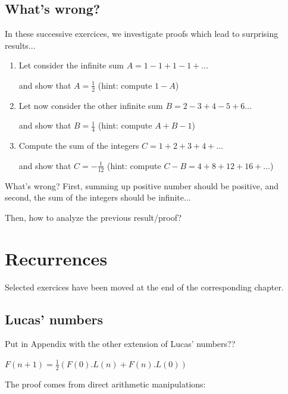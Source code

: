 \subsection{What's wrong?}

In these successive exercices, we investigate proofs which lead to surprising results...

\begin{enumerate}
\item
Let consider the infinite sum $A = 1-1+1-1+ \ldots$

and show that $A=\frac{1}{2}$ (hint: compute $1-A$)
\item
Let now consider the other infinite sum $B=2-3+4-5+6 \ldots$

and show that $B=\frac{1}{4}$ (hint: compute $A+B-1$)
\item 
Compute the sum of the integers $C=1+2+3+4+ \ldots$

and show that $C=-\frac{1}{12}$ (hint: compute $C-B=4+8+12+16+ \ldots$)
\end{enumerate}

What's wrong?
First, summing up positive number should be positive, 
and second, the sum of the integers should be infinite...

Then, how to analyze the previous result/proof?



\section{Recurrences}

Selected exercices have been moved at the end of the corresponding chapter.

\subsection{Lucas' numbers}

{\Denis Put in Appendix with the other extension of Lucas' numbers??}

\begin{prop} 
$F(n+1) = \frac{1}{2} (F(0).L(n) + F(n).L(0))$
\end{prop}
\medskip

\noindent
The proof comes from direct arithmetic manipulations:

